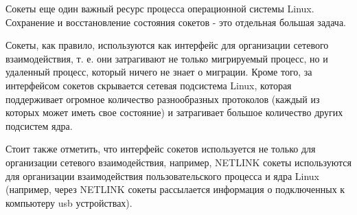 Сокеты еще один важный ресурс процесса операционной системы Linux. Сохранение и восстановление состояния сокетов - это отдельная большая задача.

Сокеты, как правило, используются как интерфейс для организации сетевого взаимодействия, т. е. они затрагивают не только мигрируемый процесс, но и удаленный процесс, который ничего не знает о миграции. Кроме того, за интерфейсом сокетов скрывается сетевая подсистема Linux, которая поддерживает огромное количество разнообразных протоколов (каждый из которых может иметь свое состояние) и затрагивает большое количество других подсистем ядра.

Стоит также отметить, что интерфейс сокетов используется не только для организации сетевого взаимодействия, например, NETLINK сокеты используются для организации взаимодействия пользовательского процесса и ядра Linux (например, через NETLINK сокеты рассылается информация о подключенных к компьютеру usb устройствах).
